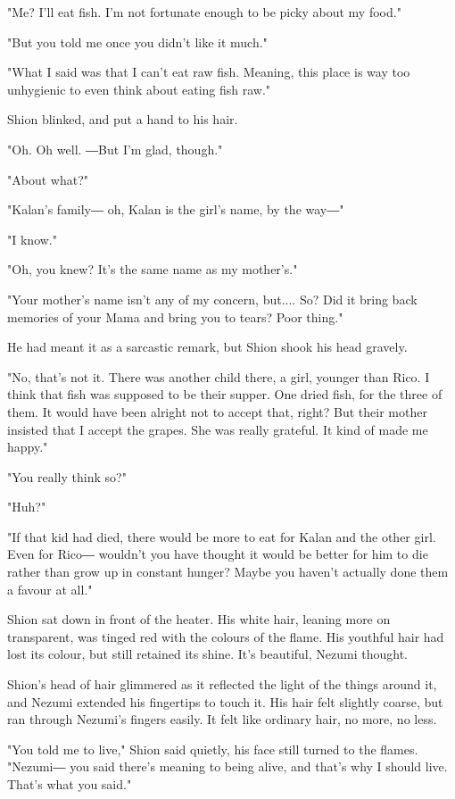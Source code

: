"Me? I'll eat fish. I'm not fortunate enough to be picky about my food."

"But you told me once you didn't like it much."

"What I said was that I can't eat raw fish. Meaning, this place is way
too unhygienic to even think about eating fish raw."

Shion blinked, and put a hand to his hair.

"Oh. Oh well. ―But I'm glad, though."

"About what?"

"Kalan's family― oh, Kalan is the girl's name, by the way―"

"I know."

"Oh, you knew? It's the same name as my mother's."

"Your mother's name isn't any of my concern, but.... So? Did it bring
back memories of your Mama and bring you to tears? Poor thing."

He had meant it as a sarcastic remark, but Shion shook his head gravely.

"No, that's not it. There was another child there, a girl, younger than
Rico. I think that fish was supposed to be their supper. One dried fish,
for the three of them. It would have been alright not to accept that,
right? But their mother insisted that I accept the grapes. She was
really grateful. It kind of made me happy."

"You really think so?"

"Huh?"

"If that kid had died, there would be more to eat for Kalan and the
other girl. Even for Rico― wouldn't you have thought it would be better
for him to die rather than grow up in constant hunger? Maybe you haven't
actually done them a favour at all."

Shion sat down in front of the heater. His white hair, leaning more on
transparent, was tinged red with the colours of the flame. His youthful
hair had lost its colour, but still retained its shine. It's beautiful,
Nezumi thought.

Shion's head of hair glimmered as it reflected the light of the things
around it, and Nezumi extended his fingertips to touch it. His hair felt
slightly coarse, but ran through Nezumi's fingers easily. It felt like
ordinary hair, no more, no less.

"You told me to live," Shion said quietly, his face still turned to the
flames. "Nezumi― you said there's meaning to being alive, and that's why
I should live. That's what you said."

